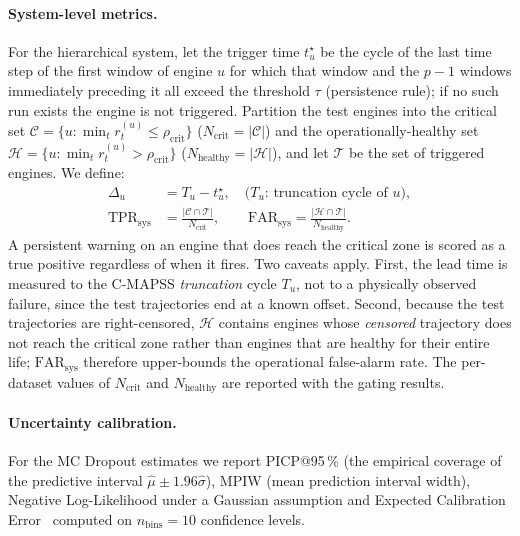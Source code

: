 \documentclass[5p,times,authoryear]{elsarticle}
\begin{document}
\paragraph{System-level metrics.} For the hierarchical system, let the trigger time $t^\star_u$ be the cycle of the last time step of the first window of engine $u$ for which that window and the $p-1$ windows immediately preceding it all exceed the threshold $\tau$ (persistence rule); if no such run exists the engine is not triggered. Partition the test engines into the critical set $\mathcal{C}=\{u:\min_t r^{(u)}_t\le\rho_{\mathrm{crit}}\}$ ($N_{\mathrm{crit}}=|\mathcal{C}|$) and the operationally-healthy set $\mathcal{H}=\{u:\min_t r^{(u)}_t>\rho_{\mathrm{crit}}\}$ ($N_{\mathrm{healthy}}=|\mathcal{H}|$), and let $\mathcal{T}$ be the set of triggered engines. We define:
\begin{align}
\Delta_u &= T_u - t^\star_u, \quad\text{($T_u$: truncation cycle of $u$)},\\
\mathrm{TPR}_{\mathrm{sys}} &= \frac{|\mathcal{C}\cap\mathcal{T}|}{N_{\mathrm{crit}}}, \qquad
\mathrm{FAR}_{\mathrm{sys}} = \frac{|\mathcal{H}\cap\mathcal{T}|}{N_{\mathrm{healthy}}}.
\end{align}
A persistent warning on an engine that does reach the critical zone is scored as a true positive regardless of when it fires. Two caveats apply. First, the lead time is measured to the C-MAPSS \emph{truncation} cycle $T_u$, not to a physically observed failure, since the test trajectories end at a known offset. Second, because the test trajectories are right-censored, $\mathcal{H}$ contains engines whose \emph{censored} trajectory does not reach the critical zone rather than engines that are healthy for their entire life; $\mathrm{FAR}_{\mathrm{sys}}$ therefore upper-bounds the operational false-alarm rate. The per-dataset values of $N_{\mathrm{crit}}$ and $N_{\mathrm{healthy}}$ are reported with the gating results.

\paragraph{Uncertainty calibration.} For the MC Dropout estimates we report PICP@95\,\% (the empirical coverage of the predictive interval $\hat\mu\pm 1.96\hat\sigma$), MPIW (mean prediction interval width), Negative Log-Likelihood under a Gaussian assumption and Expected Calibration Error~\citep{guo2017calibration} computed on $n_{\mathrm{bins}}=10$ confidence levels.

\end{document}
